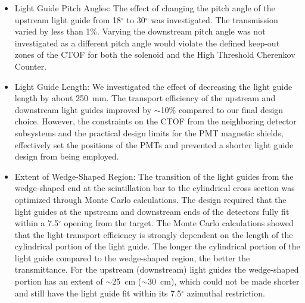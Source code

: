 \documentclass{elsart}
\begin{document}
\begin{itemize}

\item Light Guide Pitch Angles: The effect of changing the pitch angle of the upstream light 
guide from 18$^\circ$ to 30$^\circ$ was investigated. The transmission varied by less than 1\%. 
Varying the downstream pitch angle was not investigated as a different pitch angle would 
violate the defined keep-out zones of the CTOF for both the solenoid and the High Threshold 
Cherenkov Counter.

\vskip 0.5cm

\item Light Guide Length: We investigated the effect of decreasing the light guide length by 
about 250~mm. The transport efficiency of the upstream and downstream light guides improved 
by $\sim$10\% compared to our final design choice. However, the constraints on the CTOF from 
the neighboring detector subsystems and the practical design limits for the PMT magnetic 
shields, effectively set the positions of the PMTs and prevented a shorter light guide design 
from being employed.

\vskip 0.5cm

\item Extent of Wedge-Shaped Region: The transition of the light guides from the wedge-shaped 
end at the scintillation bar to the cylindrical cross section was optimized through Monte 
Carlo calculations. The design required that the light guides at the upstream and downstream 
ends of the detectors fully fit within a 7.5$^\circ$ opening from the target. The Monte Carlo 
calculations showed that the light transport efficiency is strongly dependent on the length 
of the cylindrical portion of the light guide. The longer the cylindrical portion of the light 
guide compared to the wedge-shaped region, the better the transmittance. For the upstream 
(downstream) light guides the wedge-shaped portion has an extent of $\sim$25~cm ($\sim$30~cm), 
which could not be made shorter and still have the light guide fit within its 7.5$^\circ$ 
azimuthal restriction.

\vskip 0.5cm


\end{itemize}
\end{document}

